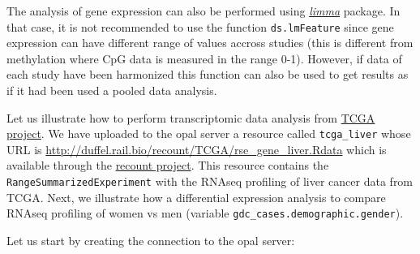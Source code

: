 \documentclass[]{article}
\newenvironment{Shaded}{\begin{snugshade}}{\end{snugshade}}
\newcommand{\DataTypeTok}[1]{\textcolor[rgb]{0.13,0.29,0.53}{#1}}
\newcommand{\KeywordTok}[1]{\textcolor[rgb]{0.13,0.29,0.53}{\textbf{#1}}}
\newcommand{\NormalTok}[1]{#1}
\newcommand{\OperatorTok}[1]{\textcolor[rgb]{0.81,0.36,0.00}{\textbf{#1}}}
\newcommand{\OtherTok}[1]{\textcolor[rgb]{0.56,0.35,0.01}{#1}}
\newcommand{\StringTok}[1]{\textcolor[rgb]{0.31,0.60,0.02}{#1}}
\begin{document}
The analysis of gene expression can also be performed using
\emph{\href{https://bioconductor.org/packages/3.9/limma}{limma}}
package. In that case, it is not recommended to use the function
\texttt{ds.lmFeature} since gene expression can have different range of
values accross studies (this is different from methylation where CpG
data is measured in the range 0-1). However, if data of each study have
been harmonized this function can also be used to get results as if it
had been used a pooled data analysis.

Let us illustrate how to perform transcriptomic data analysis from
\href{https://www.cancer.gov/about-nci/organization/ccg/research/structural-genomics/tcga}{TCGA
project}. We have uploaded to the opal server a resource called
\texttt{tcga\_liver} whose URL is
\url{http://duffel.rail.bio/recount/TCGA/rse_gene_liver.Rdata} which is
available through the
\href{https://jhubiostatistics.shinyapps.io/recount/}{recount project}.
This resource contains the \texttt{RangeSummarizedExperiment} with the
RNAseq profiling of liver cancer data from TCGA. Next, we illustrate how
a differential expression analysis to compare RNAseq profiling of women
vs men (variable \texttt{gdc\_cases.demographic.gender}).

Let us start by creating the connection to the opal server:

\begin{Shaded}
\end{Shaded}
\end{document}
